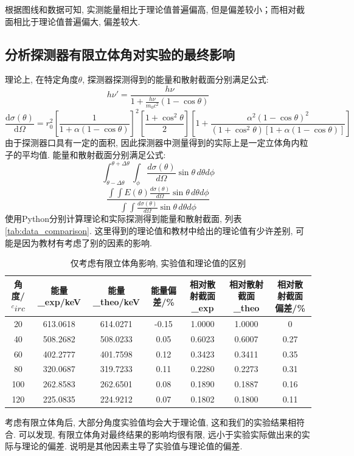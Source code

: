 \documentclass[font=default]{mpltx}
\begin{document}
      根据图线和数据可知, 实测能量相比于理论值普遍偏高, 但是偏差较小；而相对截面相比于理论值普遍偏大, 偏差较大.

    \subsection{分析探测器有限立体角对实验的最终影响}
      理论上, 在特定角度$\theta$, 探测器探测得到的能量和散射截面分别满足公式: 
      $$
      h\nu' = \frac{h\nu}{1 + \frac{h\nu}{m_0 c^2}(1 - \cos\theta)}
      $$
      $$
      \frac{\mathrm{d}\sigma(\theta)}{\mathrm{d}\Omega} = r_0^2 \left[ \frac{1}{1 + \alpha(1 - \cos\theta)} \right]^2 \left[ \frac{1 + \cos^2\theta}{2} \right] \left[ 1 + \frac{\alpha^2(1 - \cos\theta)^2}{(1 + \cos^2\theta)\left[ 1 + \alpha(1 - \cos\theta) \right]} \right]
      $$
      由于探测器口具有一定的面积, 因此探测器中测量得到的实际上是一定立体角内粒子的平均值. 能量和散射截面分别满足公式:
      $$
      \int_{\theta-\Delta\theta}^{\theta+\Delta\theta} \int_{\phi} \frac{d\sigma(\theta)}{d\Omega} \sin\theta \, d\theta d\phi    
      $$
      $$
      \frac{\int\int E(\theta) \frac{d\sigma(\theta)}{d\Omega} \sin\theta \, d\theta d\phi}{\int\int \frac{d\sigma(\theta)}{d\Omega} \sin\theta \, d\theta d\phi}
      $$
      使用Python分别计算理论和实际探测得到能量和散射截面, 列表\autoref{tab:data_comparison}.
      这里得到的理论值和教材\cite{jindaiwulishiyan}中给出的理论值有少许差别, 可能是因为教材有考虑了别的因素的影响. 
      
      \begin{table}[htbp]
        \centering
        \caption{仅考虑有限立体角影响, 实验值和理论值的区别}
        \begin{tabular}{ccccccc}
          \toprule
           角度/$^circ$ & 能量_exp/keV & 能量_theo/keV & 能量偏差/\% & 相对散射截面_exp & 相对散射截面_theo & 相对散射截面偏差/\%\\
          \midrule
           20 & 613.0618 & 614.0271 & -0.15 & 1.0000 & 1.0000 & 0\\
           40 & 508.2682 & 508.0233 & 0.05 & 0.6023 & 0.6007 & 0.27\\
           60 & 402.2777 & 401.7598 & 0.12 & 0.3423 & 0.3411 & 0.35 \\
           80 & 320.0687 & 319.7233 & 0.11 & 0.2280 & 0.2273 & 0.31\\
           100 & 262.8583 & 262.6501 & 0.08 & 0.1890 & 0.1887 & 0.16\\
           120 & 225.0835 & 224.9212 & 0.07 & 0.1802 & 0.1800 & 0.11\\
          \bottomrule
        \end{tabular}
        \label{tab:data_comparison}
      \end{table}
      考虑有限立体角后, 大部分角度实验值均会大于理论值, 这和我们的实验结果相符合. 
      可以发现, 有限立体角对最终结果的影响均很有限, 远小于实验实际做出来的实际与理论的偏差. 说明是其他因素主导了实验值与理论值的偏差. 
\end{document}
